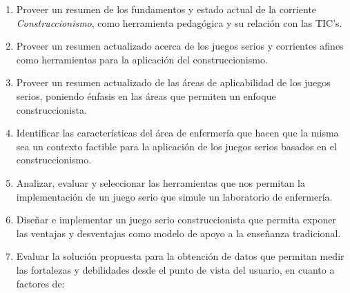 \begin{enumerate}
    \item Proveer un resumen de los fundamentos y estado actual de la corriente
        \emph{Construccionismo}, como herramienta pedagógica y su relación con
        las TIC's.

    \item Proveer un resumen actualizado acerca de los juegos serios y corrientes afines como
        herramientas para la aplicación del construccionismo.
    
    \item Proveer un resumen actualizado de las áreas de aplicabilidad de los juegos serios, poniendo
        énfasis en las áreas que permiten un enfoque construccionista.
        
    \item Identificar las características del área de enfermería que hacen que
        la misma sea un contexto factible para la aplicación de los juegos
        serios basados en el construccionismo.
    
    \item Analizar, evaluar y seleccionar las herramientas que nos permitan la
        implementación de un juego serio que simule un laboratorio de
        enfermería.
        
    \item Diseñar e implementar un juego serio construccionista que permita
        exponer las ventajas y desventajas como modelo de apoyo a la enseñanza
        tradicional. 

    \item Evaluar la solución propuesta para la obtención de datos que permitan
        medir las fortalezas y debilidades desde el punto de vista del usuario,
        en cuanto a factores de:


\end{enumerate}
